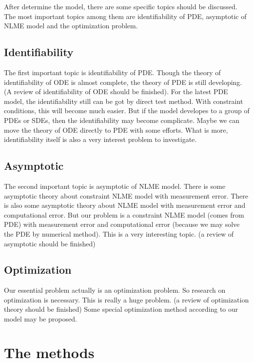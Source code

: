 \documentclass[12pt]{extarticle}
\begin{document}
After determine the model, there are some specific topics should be discussed. The most important topics among them are identifiability of PDE, asymptotic of NLME model and the optimization problem.

\subsection{Identifiability}

The first important topic is identifiability of PDE. Though the theory of identifiability of ODE is almost complete, the theory of PDE is still developing. (A review of identifiability of ODE should be finished). For the latest PDE model, the identifiability still can be got by direct test method. With constraint conditions, this will become much easier. But if the model developes to a group of PDEs or SDEs, then the identifiability may become complicate. Maybe we can move the theory of ODE directly to PDE with some efforts. What is more, identifiability itself is also a very interest problem to investigate.

\subsection{Asymptotic}

The second important topic is asymptotic of NLME model. There is some asymptotic theory about constraint NLME model with measurement error. There is also some asymptotic theory about NLME model with measurement error and computational error. But our problem is a constraint NLME model (comes from PDE) with measurement error and computational error (because we may solve the PDE by numerical method). This is a very interesting topic. (a review of asymptotic should be finished)

\subsection{Optimization}

Our essential problem actually is an optimization problem. So research on optimization is necessary. This is really a huge problem. (a review of optimization theory should be finished) Some special optimization method according to our model may be proposed. 

\section{The methods}
\end{document}
